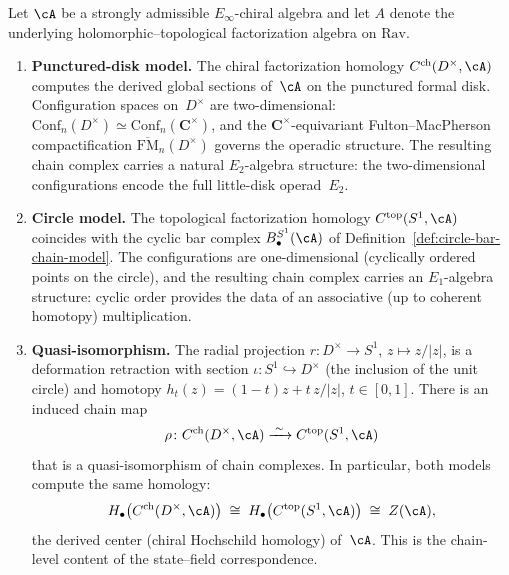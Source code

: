 \begin{proposition}%
\label{prop:chain-D-vs-S1}%
%
%
%
Let $\cA$ be a strongly admissible $E_\infty$-chiral algebra
and let $A$ denote the underlying holomorphic--topological
factorization algebra on $\mathrm{Rav}$.
\begin{enumerate}[label=\textup{(\roman*)}]
\item \textbf{Punctured-disk model.}
 The chiral factorization homology $C^{\mathrm{ch}}(D^\times,\cA)$
 computes the derived global sections of~$\cA$ on the punctured
 formal disk.
 Configuration spaces on~$D^\times$ are two-dimensional:
 $\mathrm{Conf}_n(D^\times)\simeq
 \mathrm{Conf}_n(\mathbf{C}^\times)$, and the
 $\mathbf{C}^\times$-equivariant Fulton--MacPherson
 compactification
 $\overline{\mathrm{FM}}_n(D^\times)$ governs the
 operadic structure.
 The resulting chain complex carries a natural $E_2$-algebra
 structure: the two-dimensional configurations encode the
 full little-disk operad~$E_2$.

\item \textbf{Circle model.}
 The topological factorization homology $C^{\mathrm{top}}(S^1,\cA)$
 coincides with the cyclic bar complex $B^{S^1}_\bullet(\cA)$
 of Definition~\textup{\ref{def:circle-bar-chain-model}}.
 The configurations are one-dimensional
 (cyclically ordered points on the circle),
 and the resulting chain complex carries an $E_1$-algebra
 structure: cyclic order provides the data of an
 associative (up to coherent homotopy) multiplication.

\item \textbf{Quasi-isomorphism.}
 The radial projection
 $r\colon D^\times\to S^1$, $z\mapsto z/|z|$,
 is a deformation retraction with section
 $\iota\colon S^1\hookrightarrow D^\times$ (the
 inclusion of the unit circle) and homotopy
 $h_t(z)=(1-t)z + t\,z/|z|$, $t\in[0,1]$.
 There is an induced chain map
 \begin{equation}\label{eq:rho-chain-map}
 \rho\colon C^{\mathrm{ch}}(D^\times,\cA)
 \xrightarrow{\;\sim\;}
 C^{\mathrm{top}}(S^1,\cA)
 \end{equation}
 that is a quasi-isomorphism of chain complexes.
 In particular, both models compute the same homology:
 \[
 H_\bullet\bigl(C^{\mathrm{ch}}(D^\times,\cA)\bigr)
 \;\cong\;
 H_\bullet\bigl(C^{\mathrm{top}}(S^1,\cA)\bigr)
 \;\cong\;
 Z(\cA),
 \]
 the derived center (chiral Hochschild homology)
 of~$\cA$. This is the chain-level content of the
 state--field correspondence.


\end{enumerate}
\end{proposition}
